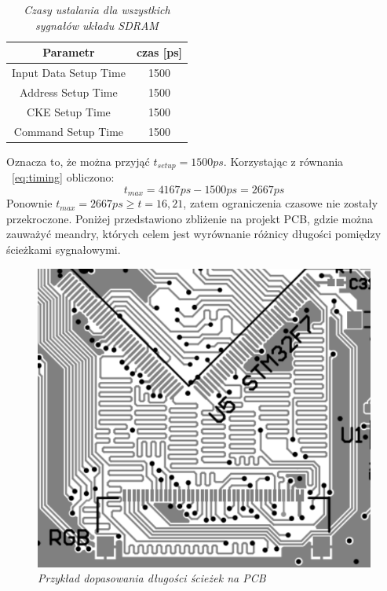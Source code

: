 \documentclass[eng,printmode]{mgr}
\begin{document}
\begin{table}[htb]
\def\arraystretch{1.3}%
\caption{\textit{ Czasy ustalania dla wszystkich sygnałów układu SDRAM}}
\label{tab:sdramTiming}
\begin{center}
\begin{tabular}{ |c|c| }
\hline
Parametr  & czas [ps] \\ 
\hline
Input Data Setup Time & 1500 \\ 
\hline
Address Setup Time & 1500\\ 
\hline
CKE Setup Time	 & 1500\\ 
\hline
Command Setup Time	 & 1500\\ 
\hline
\end{tabular}
\end{center}
\end{table}

\noindent
Oznacza to, że można przyjąć $t_{setup}=1500ps$. Korzystając z równania ~\ref{eq:timing} obliczono:
$$
t_{max} = 4167ps - 1500ps = 2667ps
$$
Ponownie $t_{max}= 2667ps \geq t=16,21$, zatem ograniczenia czasowe nie zostały przekroczone.
Poniżej przedstawiono zbliżenie na projekt PCB, gdzie można zauważyć meandry, których celem jest wyrównanie różnicy długości pomiędzy ścieżkami sygnałowymi.

\begin{figure}[!h]
    \centering
    \includegraphics[width=\textwidth]{pcb/ltdc.png}
    \caption{\textit{Przykład dopasowania długości ścieżek na PCB}}
\end{figure}
\end{document}
